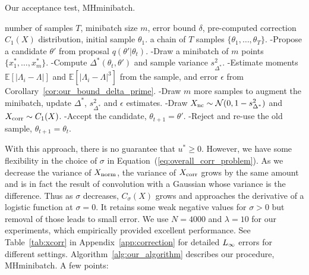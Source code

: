 \documentclass[letterpaper]{article}
\newcommand{\mE}{\mathbb{E}}
\begin{document}
\begin{algorithm}[tb]
\caption{Our acceptance test, {\sc MHminibatch}.}
\label{alg:our_algorithm}
\begin{algorithmic}
     number of samples $T$, minibatch size $m$, error
        bound $\delta$, pre-computed correction $C_1(X)$ distribution, initial
        sample $\theta_1$.
     a chain of $T$ samples
        $\{\theta_1,\ldots,\theta_T\}$.
        \STATE -Propose a candidate $\theta'$ from proposal
            $q(\theta' | \theta_t)$.
        \STATE -Draw a minibatch of $m$ points $\{x_1^*,\ldots,x_m^*\}$.
        \STATE -Compute $\Delta^*(\theta_t,\theta')$ and sample variance
            $s^2_{\Delta^*}$.
        \STATE -Estimate moments $\mE[|\Lambda_i-\Lambda|]$ and
            $\mE[|\Lambda_i-\Lambda|^3]$ from the sample, and error $\epsilon$
            from Corollary~\ref{cor:our_bound_delta_prime}.
            \STATE -Draw $m$ more samples to augment the minibatch, update
                $\Delta^*$, $s^2_{\Delta^*}$ and $\epsilon$ estimates.
        \ENDWHILE
        \STATE -Draw $X_{\rm nc} \sim \mathcal{N}(0,1-s^2_{\Delta^*})$ and
            $X_{\rm corr} \sim C_1(X)$.
        \STATE -Accept the candidate, $\theta_{t+1} = \theta'$.
    \ELSE
        \STATE -Reject and re-use the old sample, $\theta_{t+1} = \theta_t$.
    \ENDIF
    \ENDFOR
\end{algorithmic}
\end{algorithm}

With this approach, there is no guarantee that $u^* \geq 0$. However, we have
some flexibility in the choice of $\sigma$ in
Equation~(\ref{eq:overall_corr_problem}).  As we decrease the variance of
$X_{\rm norm}$, the variance of $X_{\rm corr}$ grows by the same amount and is
in fact the result of convolution with a Gaussian whose variance is the
difference.  Thus as $\sigma$ decreases, $C_\sigma(X)$ grows and approaches the
derivative of a logistic function at $\sigma = 0$. It retains some weak negative
values for $\sigma > 0$ but removal of those leads to small error. We use
$N=4000$ and $\lambda=10$ for our experiments, which empirically provided
excellent performance. See Table~\ref{tab:xcorr} in
Appendix~\ref{app:correction} for detailed $L_{\rm \infty}$ errors for different
settings. Algorithm~\ref{alg:our_algorithm} describes our procedure, {\sc
MHminibatch}. A few points:
\end{document}
